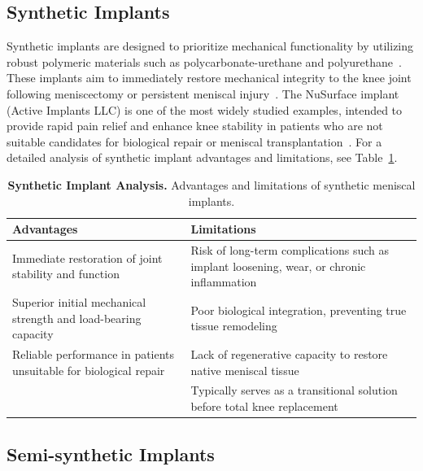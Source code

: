\newpage
\subsection{Synthetic Implants}

Synthetic implants are designed to prioritize mechanical functionality by utilizing robust polymeric materials such as polycarbonate-urethane and polyurethane~\cite{gupta2020meniscaltissue, sun2017overviewscaffold}. These implants aim to immediately restore mechanical integrity to the knee joint following meniscectomy or persistent meniscal injury~\cite{kwon2019surgicaltissue, baek2015meniscustissue}. The NuSurface implant (Active Implants LLC) is one of the most widely studied examples, intended to provide rapid pain relief and enhance knee stability in patients who are not suitable candidates for biological repair or meniscal transplantation~\cite{ghodbane2019partialmeniscus, sun2017overviewscaffold}. For a detailed analysis of synthetic implant advantages and limitations, see Table~\ref{tab:synthetic_implants}.

\begin{table}[H]
\centering
\setlength{\tabcolsep}{8pt}
\begin{tabular}{|p{5.5cm}|p{5.5cm}|}
\hline
\rowcolor{gray!20}
\textbf{Advantages} & \textbf{Limitations} \\ \hline
Immediate restoration of joint stability and function & 
Risk of long-term complications such as implant loosening, wear, or chronic inflammation \\ \hline
Superior initial mechanical strength and load-bearing capacity & 
Poor biological integration, preventing true tissue remodeling \\ \hline
Reliable performance in patients unsuitable for biological repair & 
Lack of regenerative capacity to restore native meniscal tissue \\ \hline
\multicolumn{1}{|c|}{} & 
Typically serves as a transitional solution before total knee replacement \\ \hline
\end{tabular}
\caption[Synthetic Implant Analysis]{\textbf{Synthetic Implant Analysis.} Advantages and limitations of synthetic meniscal implants.}
\label{tab:synthetic_implants}\end{table}

\subsection{Semi-synthetic Implants}    

